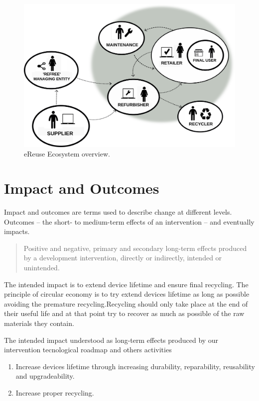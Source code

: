 \documentclass[
]{book}
\providecommand{\tightlist}{%
  \setlength{\itemsep}{0pt}\setlength{\parskip}{0pt}}
\begin{document}
\begin{figure}

{\centering \includegraphics[width=0.5\linewidth]{./figs/3} 

}

\caption{eReuse Ecosystem overview.}\label{fig:ereuseecosystem}
\end{figure}

\hypertarget{impact-and-outcomes}{%
\section{Impact and Outcomes}\label{impact-and-outcomes}}

Impact and outcomes are terms used to describe change at different levels. Outcomes -- the short- to medium-term effects of an intervention -- and eventually impacts.

\begin{quote}
Positive and negative, primary and secondary long-term effects produced by a development intervention, directly or indirectly, intended or unintended.
\end{quote}

The intended impact is to extend device lifetime and ensure final recycling. The principle of circular economy is to try extend devices lifetime as long as possible avoiding the premature recycling.Recycling should only take place at the end of their useful life and at that point try to recover as much as possible of the raw materials they contain.

The intended impact understood as long-term effects produced by our intervention tecnological roadmap and others activities

\begin{enumerate}
\def\labelenumi{\arabic{enumi}.}
\tightlist
\item
  Increase devices lifetime through increasing durability, reparability, reusability and upgradeability.
\item
  Increase proper recycling.
\end{enumerate}
\end{document}
